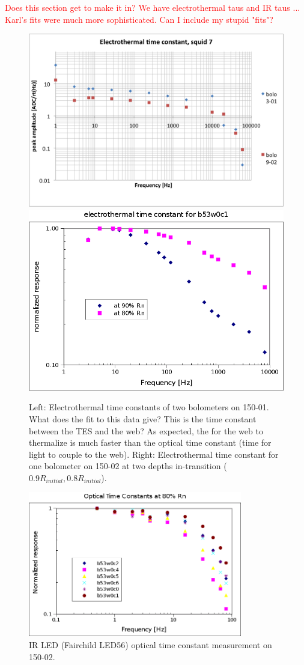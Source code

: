 \textcolor{red}{Does this section get to make it in? We have electrothermal taus and IR taus ... Karl's fits were much more sophisticated. Can I include my stupid "fits"?}

\begin{figure}[ht!]
\begin{center}
\includegraphics[width=0.48\columnwidth]{figures/Nb01_squid7_etau_morepts.png}
\includegraphics[width=0.48\columnwidth]{figures/b53w0c1_etau.png}
\caption{Left: Electrothermal time constants of two bolometers on 150-01. What does the fit to this data give? This is the time constant between the TES and the web? As expected, the for the web to thermalize is much faster than the optical time constant (time for light to couple to the web). Right: Electrothermal time constant for one bolometer on 150-02 at two depths in-transition ($0.9R_{initial}, 0.8R_{initial}$). 
\label{fig:electrothermal_tau} }
\end{center}
\end{figure}

\begin{figure}[ht!]
\begin{center}
\includegraphics[height=2.5in]{figures/b53w0_ir_led_tau.png}
\caption{IR LED (Fairchild LED56) optical time constant measurement on 150-02. 
\label{fig:ir_led_tau} }
\end{center}
\end{figure}

